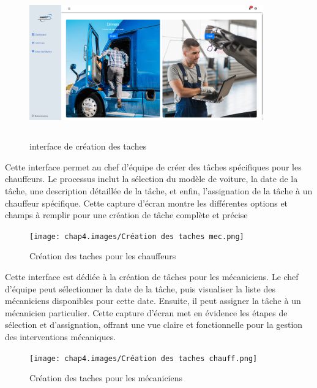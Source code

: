 \begin{figure}[h!]
  \centering
  \includegraphics[width=0.9\textwidth,height=6.5cm]{chap4.images/creer taches.png}
  \caption{interface de création des taches}

\end{figure}



Cette interface permet au chef d'équipe de créer des tâches spécifiques pour les chauffeurs. Le processus inclut la sélection du modèle de voiture, la date de la tâche, une description détaillée de la tâche, et enfin, l'assignation de la tâche à un chauffeur spécifique. Cette capture d'écran montre les différentes options et champs à remplir pour une création de tâche complète et précise

\begin{figure}[h!]
  \centering
  \texttt{[image: chap4.images/Création des taches mec.png]}
  \caption{Création des taches pour les chauffeurs}

  \newpage
\end{figure}
\bigskip
Cette interface est dédiée à la création de tâches pour les mécaniciens. Le chef d'équipe peut sélectionner la date de la tâche, puis visualiser la liste des mécaniciens disponibles pour cette date. Ensuite, il peut assigner la tâche à un mécanicien particulier. Cette capture d'écran met en évidence les étapes de sélection et d'assignation, offrant une vue claire et fonctionnelle pour la gestion des interventions mécaniques.
\begin{figure}[h!]
  \centering
  \texttt{[image: chap4.images/Création des taches chauff.png]}
  \caption{Création des taches pour les mécaniciens}

\end{figure}

